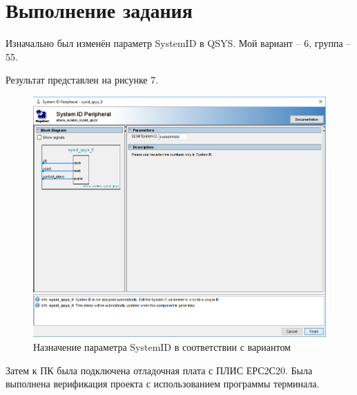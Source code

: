 \section*{Выполнение задания}
Изначально был изменён параметр SystemID в QSYS. 
Мой вариант -- 6, группа -- 55.

Результат представлен на рисунке 7.

\FloatBarrier
\begin{figure}[h]
	\begin{center}
		\includegraphics[width=\linewidth]{inc/newID.png}
	\end{center}
	\caption{Назначение параметра SystemID в соответствии с вариантом}
\end{figure}
\FloatBarrier

Затем к ПК была подключена отладочная плата с ПЛИС ЕРС2С20.
Была выполнена верификация проекта с использованием программы терминала.

